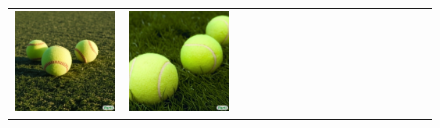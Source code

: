\begin{figure}
\begin{adjustwidth}{-0.8in}{-0.5in}
\begin{tabular}{cccccccccccccccccccc}
\multicolumn{3}{c}{\includegraphics[width=\twobytwocolwidth\textwidth]{figures/limitations/3mergedballs.jpg}} &
\multicolumn{3}{c}{\includegraphics[width=\twobytwocolwidth\textwidth]{figures/limitations/3tennisballs.jpg}} &&

\end{tabular}
\end{adjustwidth}
\end{figure}
